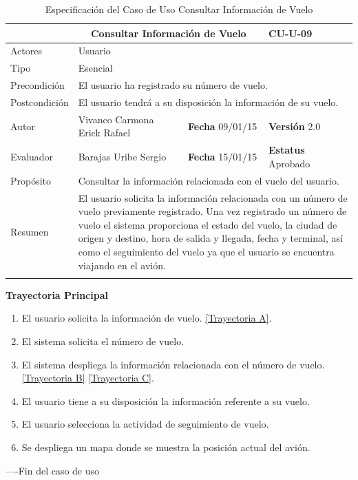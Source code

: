\begin{longtable}{|p{2.5cm}|p{6.4cm}|p{2cm}|p{2cm}|}
	\hline
		\rowcolor[RGB]{255,102,102}{Caso de Uso}&\multicolumn{2}{c}{Consultar Información de Vuelo}&{\textbf{CU-U-09}}\\
	\hline
		{Actores}&\multicolumn{3}{p{11.2cm}|}{Usuario}\\
	\hline
		{Tipo}&\multicolumn{3}{p{11.2cm}|}{Esencial}\\
	\hline
		{Precondición}&\multicolumn{3}{p{11.2cm}|}{	El usuario ha registrado su número de vuelo.}\\
	\hline
		{Postcondición}&\multicolumn{3}{p{11.2cm}|}{El usuario tendrá a su disposición la información de su vuelo.}\\
	\hline
		{Autor}&{Vivanco Carmona Erick Rafael}&{\textbf{Fecha} 09/01/15}&{\textbf{Versión} 2.0}\\
			\hline
		{Evaluador}&{Barajas Uribe Sergio}&{\textbf{Fecha} 15/01/15}&{\textbf{Estatus} Aprobado}\\
	\hline
		{Propósito}&\multicolumn{3}{p{11.2cm}|}{Consultar la información relacionada con el vuelo del usuario.}\\
	\hline
		{Resumen}&\multicolumn{3}{p{11.2cm}|}{El usuario solicita la información relacionada con un número de vuelo previamente registrado. Una vez registrado un número de vuelo el sistema proporciona el estado del vuelo, la ciudad de origen y destino, hora de salida y llegada, fecha y terminal, así como el seguimiento del vuelo ya que el usuario se encuentra viajando en el avión.}\\	
	\hline
	\caption[Especificación del Caso de Uso Consultar Información de Vuelo]{Especificación del Caso de Uso Consultar Información de Vuelo}
    	\label{tab:cuConsultarInformacionVuelo}
\end{longtable}

\begin{flushleft}
	\textbf{Trayectoria Principal}\\
	\begin{enumerate}
		\item El usuario solicita la información de vuelo. \hyperlink{TrayectoriaA_CU-U-09}{[Trayectoria A]}.
		\item El sistema solicita el número de vuelo.
		\item El sistema despliega la información relacionada con el número de vuelo. \hyperlink{TrayectoriaB_CU-U-09}{[Trayectoria B]} \hyperlink{TrayectoriaC_CU-U-09}{[Trayectoria C]}.
		\item El usuario tiene a su disposición la información referente a su vuelo.
		\item El usuario selecciona la actividad de seguimiento de vuelo.
		\item	Se despliega un mapa donde se muestra la posición actual del avión.
	\end{enumerate}
\end{flushleft}
----Fin del caso de uso

